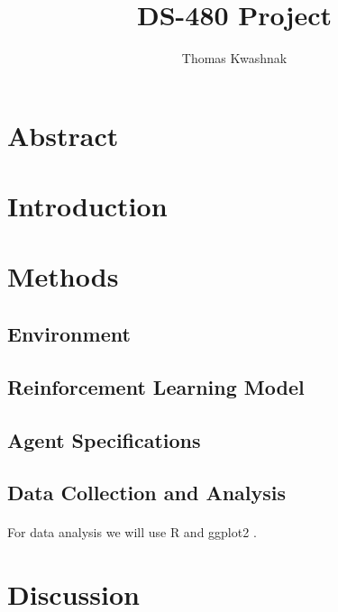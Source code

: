 \documentclass[12pt]{article}
\author{Thomas Kwashnak}
\title{DS-480 Project}
\begin{document}
\maketitle

\newpage

\section{Abstract}

\section{Introduction}

\section{Methods}

\subsection{Environment}

\subsection{Reinforcement Learning Model}

\subsection{Agent Specifications}

\subsection{Data Collection and Analysis}

\paragraph{}
For data analysis we will use R \cite{lang_r} and ggplot2 \cite{lib_ggplot2}.

\section{Discussion}

\newpage


\end{document}
